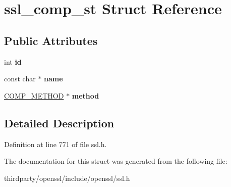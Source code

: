 \hypertarget{structssl__comp__st}{}\section{ssl\+\_\+comp\+\_\+st Struct Reference}
\label{structssl__comp__st}
\subsection*{Public Attributes}
\begin{DoxyCompactItemize}
\item 
\mbox{\label{structssl__comp__st_aa0289c534fa9807fd873d0586c5e49aa}} 
int {\bfseries id}
\item 
\mbox{\label{structssl__comp__st_a5f5f77d06eefedaaa25bab3779a37c7b}} 
const char $\ast$ {\bfseries name}
\item 
\mbox{\label{structssl__comp__st_a0db9c4890962ace222be72135c08b26c}} 
\hyperlink{structcomp__method__st}{C\+O\+M\+P\+\_\+\+M\+E\+T\+H\+OD} $\ast$ {\bfseries method}
\end{DoxyCompactItemize}


\subsection{Detailed Description}


Definition at line 771 of file ssl.\+h.



The documentation for this struct was generated from the following file\+:\begin{DoxyCompactItemize}
\item 
thirdparty/openssl/include/openssl/ssl.\+h\end{DoxyCompactItemize}
